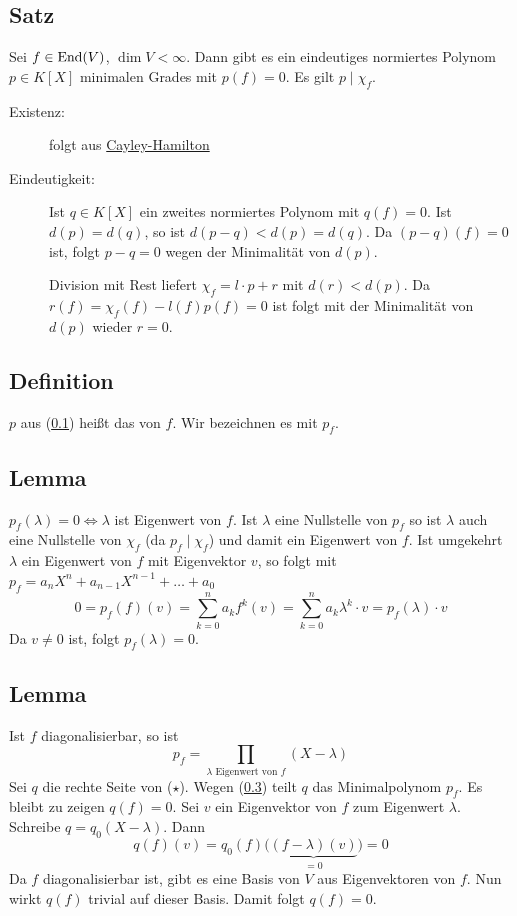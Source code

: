 \subsection[Satz über Eigenschaften des Minimalpolynoms]{Satz} %
\label{sub:84}
Sei $f \in \operatorname{End}(V)$, $\dim V < \infty$. Dann gibt es ein eindeutiges normiertes Polynom $p \in K[X]$ minimalen Grades mit $p(f)=0$. Es gilt $p \mid \chi_f$.
\begin{description}
	\item[Existenz:] folgt aus \hyperref[sub:83]{Cayley-Hamilton}
	\item[Eindeutigkeit:] Ist $q \in K[X]$ ein zweites normiertes Polynom mit $q(f)=0$. Ist $d(p)=d(q)$, so ist $d(p-q)< d(p) = d(q)$. Da $(p-q)(f)=0$ ist, folgt
	$p-q=0$ wegen der Minimalität von $d(p)$.  
	
	Division mit Rest liefert $\chi_f = l \cdot p +r$ mit $d(r)< d(p)$. Da $r(f)= \chi_f (f) - l(f) p(f)=0$ ist folgt mit der Minimalität von $d(p)$ wieder $r=0$.\bewende 
\end{description}

\subsection[Definition Minimalpolynom]{Definition} %
\label{sub:85}
$p$ aus (\ref{sub:84}) heißt das  von $f$. Wir bezeichnen es mit $p_f$. 

\subsection[Lemma: Nullstellen von $p_f$ sind Eigenwerte von $chi_f$]{Lemma} %
\label{sub:86}
$p_f (\lambda ) = 0 \iff \lambda $ ist Eigenwert von $f$.
Ist $\lambda $ eine Nullstelle von $p_f$ so ist $\lambda $ auch eine Nullstelle von $\chi_f$ (da $p_f \mid \chi_f$) und damit ein Eigenwert von $f$. Ist umgekehrt $\lambda $
ein Eigenwert von $f$ mit Eigenvektor $v$, so folgt mit $p_f = a_n X^n + a_{n-1} X^{n-1} + \ldots + a_0$
\[
	0 = p_f(f)  (v) = \sum_{k=0}^{n} a_k f^k(v) = \sum_{k=0}^{n} a_k \lambda^k \cdot v = p_f (\lambda ) \cdot v 
\]
Da $v \not= 0$ ist, folgt $p_f (\lambda ) =0$. \bewende

\subsection[Lemma über das Minimalpolynom, wenn $f$ diagonalisierbar]{Lemma} %
\label{sub:87}
Ist $f$ diagonalisierbar, so ist 
\[
	p_f = \prod_{\lambda \text{ Eigenwert von }f} (X- \lambda ) \tag{$\star$}
\]
Sei $q$ die rechte Seite von ($\star$). Wegen (\ref{sub:86}) teilt $q$ das Minimalpolynom $p_f$. Es bleibt zu zeigen $q(f)=0$. Sei $v$ ein Eigenvektor von $f$ zum 
Eigenwert $\lambda $. Schreibe $q=q_0 (X -\lambda )$. Dann 
\[
	q(f) (v) = q_0 (f) \big(\underbrace{(f- \lambda) (v)}_{=0} \big) =0 
\]
Da $f$ diagonalisierbar ist, gibt es eine Basis von $V$ aus Eigenvektoren von $f$. Nun wirkt $q(f)$ trivial auf dieser Basis. Damit  folgt $q(f)=0$. \bewende

